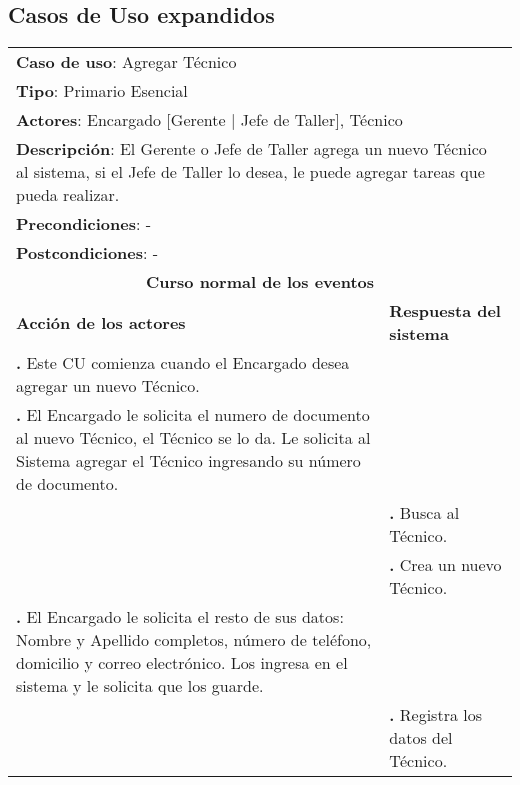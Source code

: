 \documentclass[12pt]{extarticle}
\begin{document}
    \subsection{Casos de Uso expandidos}

    \newcommand\inc{\stepcounter{step}\textbf{\thestep. }}
    \newcommand\resetinc{\setcounter{step}{0}}
    
    \newcommand\raya{\noindent\rule{169mm}{0.8mm}\\}

\begin{longtable}{ |p{8cm}|p{8cm}| }
    \hline
    \multicolumn{2}{|p{16cm}|}{\textbf{Caso de uso}: Agregar Técnico}\\
    \multicolumn{2}{|p{16cm}|}{\textbf{Tipo}: Primario Esencial}\\
    \multicolumn{2}{|p{16cm}|}{\textbf{Actores}: Encargado [Gerente | Jefe de Taller], Técnico}\\
    \multicolumn{2}{|p{16cm}|}{\textbf{Descripción}: El Gerente o Jefe de Taller agrega un nuevo Técnico al sistema, si el Jefe de Taller lo desea, le puede agregar tareas que pueda realizar.}\\
    \multicolumn{2}{|p{16cm}|}{\textbf{Precondiciones}: - }\\
    \multicolumn{2}{|p{16cm}|}{\textbf{Postcondiciones}: - }\\
    \hline
    \multicolumn{2}{|c|}{\textbf{Curso normal de los eventos}}\\
    \hline
    \textbf{Acción de los actores} & \textbf{Respuesta del sistema}\\
    \hline
        \inc Este CU comienza cuando el Encargado desea agregar un nuevo Técnico.& \\
        \hline
        \inc  El Encargado le solicita el numero de documento al nuevo Técnico, el Técnico se lo da. Le solicita al Sistema agregar el Técnico ingresando su número de documento.& \\
        \hline
        & \inc  Busca al Técnico.\\
        \hline
        & \inc  Crea un nuevo Técnico.\\
        \hline
        \inc El Encargado le solicita el resto de sus datos: Nombre y Apellido completos, número de teléfono, domicilio y correo electrónico. Los ingresa en el sistema y le solicita que los guarde.& \\
        \hline
        & \inc Registra los datos del Técnico.\\

\end{longtable}
\end{document}
